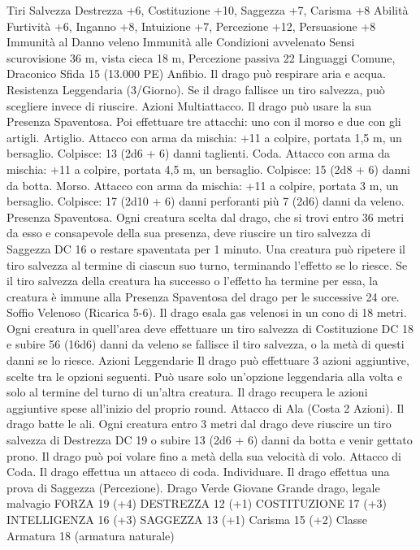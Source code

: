 \begin{multicols}{2}
Tiri Salvezza Destrezza +6, Costituzione +10, Saggezza +7,
Carisma +8
Abilità Furtività +6, Inganno +8, Intuizione +7, Percezione +12,
Persuasione +8
Immunità al Danno veleno
Immunità alle Condizioni avvelenato
Sensi scurovisione 36 m, vista cieca 18 m, Percezione passiva 22
Linguaggi Comune, Draconico
Sfida 15 (13.000 PE)
Anfibio. Il drago può respirare aria e acqua.
Resistenza Leggendaria (3/Giorno). Se il drago fallisce un tiro
salvezza, può scegliere invece di riuscire.
Azioni
Multiattacco. Il drago può usare la sua Presenza Spaventosa. Poi
effettuare tre attacchi: uno con il morso e due con gli artigli.
Artiglio. Attacco con arma da mischia: +11 a colpire, portata 1,5
m, un bersaglio.
Colpisce: 13 (2d6 + 6) danni taglienti.
Coda. Attacco con arma da mischia: +11 a colpire, portata 4,5
m, un bersaglio.
Colpisce: 15 (2d8 + 6) danni da botta.
Morso. Attacco con arma da mischia: +11 a colpire, portata 3 m,
un bersaglio.
Colpisce: 17 (2d10 + 6) danni perforanti più 7 (2d6) danni da veleno.
Presenza Spaventosa. Ogni creatura scelta dal drago, che si trovi
entro 36 metri da esso e consapevole della sua presenza, deve
riuscire un tiro salvezza di Saggezza DC 16 o restare spaventata per
1 minuto. Una creatura può ripetere il tiro salvezza al termine di
ciascun suo turno, terminando l’effetto se lo riesce. Se il tiro salvezza
della creatura ha successo o l’effetto ha termine per essa, la creatura è
immune alla Presenza Spaventosa del drago per le successive 24 ore.
Soffio Velenoso (Ricarica 5-6). Il drago esala gas velenosi in un
cono di 18 metri. Ogni creatura in quell’area deve effettuare un tiro
salvezza di Costituzione DC 18 e subire 56 (16d6) danni da veleno se
fallisce il tiro salvezza, o la metà di questi danni se lo riesce.
Azioni Leggendarie
Il drago può effettuare 3 azioni aggiuntive, scelte tra le opzioni
seguenti. Può usare solo un’opzione leggendaria alla volta e solo
al termine del turno di un’altra creatura. Il drago recupera le
azioni aggiuntive spese all’inizio del proprio round.
Attacco di Ala (Costa 2 Azioni). Il drago batte le ali. Ogni
creatura entro 3 metri dal drago deve riuscire un tiro salvezza di
Destrezza DC 19 o subire 13 (2d6 + 6) danni da botta e venir
gettato prono. Il drago può poi volare fino a metà della sua
velocità di volo.
Attacco di Coda. Il drago effettua un attacco di coda.
Individuare. Il drago effettua una prova di Saggezza
(Percezione).
Drago Verde Giovane
Grande drago, legale malvagio
FORZA 19 (+4)
DESTREZZA 12 (+1)
COSTITUZIONE 17 (+3)
INTELLIGENZA 16 (+3)
SAGGEZZA 13 (+1)
Carisma 15 (+2)
Classe Armatura 18 (armatura naturale)

\end{multicols}
